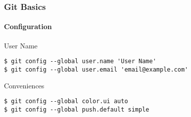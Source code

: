 \begin{frame}[fragile]
 \frametitle{Git Basics}
 \framesubtitle{Configuration}

 \begin{block}{User Name}
  \begin{verbatim}
$ git config --global user.name 'User Name'
$ git config --global user.email 'email@example.com'
  \end{verbatim}
 \end{block}
 \pause
 \begin{block}{Conveniences}
  \begin{verbatim}
$ git config --global color.ui auto
$ git config --global push.default simple
  \end{verbatim}
 \end{block}
\end{frame}
